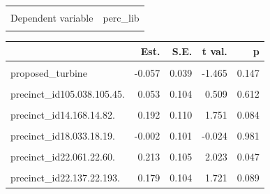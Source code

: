 \documentclass[
  letterpaper,
  DIV=11,
  numbers=noendperiod]{scrartcl}
\begin{document}
\begin{table}[!h]
\centering
\begin{tabular}{lr}
\toprule
\cellcolor{gray!10}{Observations} & \cellcolor{gray!10}{120}\\
Dependent variable & perc\_lib\\
\cellcolor{gray!10}{Type} & \cellcolor{gray!10}{OLS linear regression}\\
\bottomrule
\end{tabular}
\end{table}  \begin{table}[!h]
\centering
\begin{threeparttable}
\begin{tabular}{lrrrr}
\toprule
  & Est. & S.E. & t val. & p\\
\midrule
\cellcolor{gray!10}{(Intercept)} & \cellcolor{gray!10}{0.275} & \cellcolor{gray!10}{0.085} & \cellcolor{gray!10}{3.247} & \cellcolor{gray!10}{0.002}\\
proposed\_turbine & -0.057 & 0.039 & -1.465 & 0.147\\
\cellcolor{gray!10}{precinct\_id10.115s.10.84.} & \cellcolor{gray!10}{0.166} & \cellcolor{gray!10}{0.101} & \cellcolor{gray!10}{1.646} & \cellcolor{gray!10}{0.104}\\
precinct\_id105.038.105.45. & 0.053 & 0.104 & 0.509 & 0.612\\
\cellcolor{gray!10}{precinct\_id14.149.14.79.} & \cellcolor{gray!10}{0.208} & \cellcolor{gray!10}{0.094} & \cellcolor{gray!10}{2.201} & \cellcolor{gray!10}{0.031}\\
\addlinespace
precinct\_id14.168.14.82. & 0.192 & 0.110 & 1.751 & 0.084\\
\cellcolor{gray!10}{precinct\_id18.003.18.1.} & \cellcolor{gray!10}{0.121} & \cellcolor{gray!10}{0.107} & \cellcolor{gray!10}{1.132} & \cellcolor{gray!10}{0.261}\\
precinct\_id18.033.18.19. & -0.002 & 0.101 & -0.024 & 0.981\\
\cellcolor{gray!10}{precinct\_id21.126.21.179.} & \cellcolor{gray!10}{0.204} & \cellcolor{gray!10}{0.157} & \cellcolor{gray!10}{1.299} & \cellcolor{gray!10}{0.198}\\
precinct\_id22.061.22.60. & 0.213 & 0.105 & 2.023 & 0.047\\
\addlinespace
\cellcolor{gray!10}{precinct\_id22.124.22.52.} & \cellcolor{gray!10}{0.156} & \cellcolor{gray!10}{0.103} & \cellcolor{gray!10}{1.509} & \cellcolor{gray!10}{0.135}\\
precinct\_id22.137.22.193. & 0.179 & 0.104 & 1.721 & 0.089\\

\end{tabular}
\end{threeparttable}
\end{table}
\end{document}
